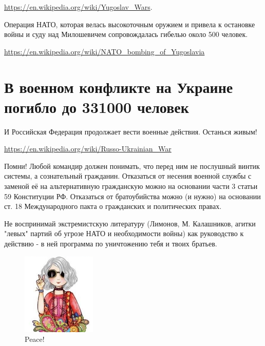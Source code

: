 \documentclass[10pt,a4paper]{article}
\begin{document}
\href{https://en.wikipedia.org/wiki/Yugoslav\_Wars}
{https://en.wikipedia.org/wiki/Yugoslav\_Wars}.

Операция НАТО, которая велась высокоточным оружием и привела к остановке войны
и суду над Милошевичем сопровождалась гибелью около 500 человек.

\href{https://en.wikipedia.org/wiki/NATO\_bombing\_of\_Yugoslavia}
{https://en.wikipedia.org/wiki/NATO\_bombing\_of\_Yugoslavia}

\section{В военном конфликте на Украине погибло до 331000 человек}

И Российская Федерация продолжает вести военные действия. Останься живым!

\href{https://en.wikipedia.org/wiki/Russo-Ukrainian\_War}
{https://en.wikipedia.org/wiki/Russo-Ukrainian\_War}

Помни! Любой командир должен понимать, что перед ним не послушный винтик
системы, а сознательный гражданин.
Отказаться от несения военной службы с заменой её на
альтернативную гражданскую можно на основании части 3 статьи 59
Конституции РФ.
Отказаться от братоубийства можно (и нужно) на основании ст. 18
Международного пакта о гражданских и политических правах.

Не воспринимай экстремистскую литературу (Лимонов, М. Калашников, агитки
"левых" партий об угрозе НАТО и необходимости войны) как руководство к
действию - в ней программа по уничтожению тебя и твоих братьев.

\begin{figure}[b]
  \centering
  \includegraphics[width=100pt]{./pacific_girl.png}
  \caption{Peace!}
  \label{fig:pacific_girl}
\end{figure}
\end{document}
